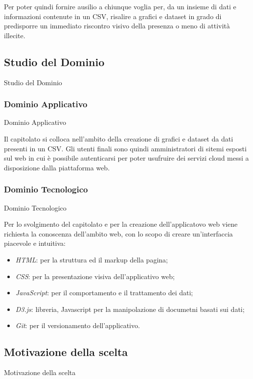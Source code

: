 \documentclass[11pt]{article}
\begin{document}
    Per poter quindi fornire ausilio a chiunque voglia per, da un insieme di dati e informazioni contenute in un CSV, risalire a grafici e dataset in grado di predisporre un immediato riscontro visivo della presenza o meno di attività illecite.
    
    \subsection{Studio del Dominio} Studio del Dominio
        \subsubsection{Dominio Applicativo} Dominio Applicativo
        
        Il capitolato si colloca nell'ambito della creazione di grafici e dataset da dati presenti in un CSV. Gli utenti finali sono quindi amministratori di sitemi esposti sul web in cui è possibile autenticarsi per poter usufruire dei servizi cloud messi a disposizione dalla piattaforma web.
        \subsubsection{Dominio Tecnologico} Dominio Tecnologico
        
        Per lo svolgimento del capitolato e per la creazione dell'applicatovo web viene richiesta la conoscenza dell'ambito web, con lo scopo di creare un'interfaccia piacevole e intuitiva:
        \begin{itemize}
            \item \textit{HTML}: per la struttura ed il markup della pagina;
            \item \textit{CSS}: per la presentazione visiva dell'applicativo web;
            \item \textit{JavaScript}: per il comportamento e il trattamento dei dati;
            \item \textit{D3.js}: libreria, Javascript per la manipolazione di documetni basati sui dati;
            \item \textit{Git}: per il versionamento dell'applicativo.
        \end{itemize}
    
    \subsection{Motivazione della scelta} Motivazione della scelta
\end{document}
